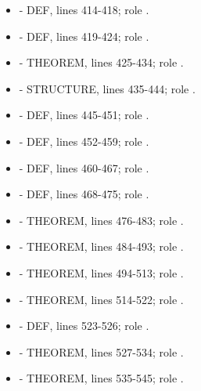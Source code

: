 \begin{itemize}
  400-413; role \texttt{\protect{}}.
\item
  \texttt{\protect{}} - DEF, lines 414-418; role \texttt{\protect{}}.
\item
  \texttt{\protect{}} - DEF, lines 419-424; role \texttt{\protect{}}.
\item
  \texttt{\protect{}} - THEOREM, lines 425-434;
  role \texttt{\protect{}}.
\item
  \texttt{\protect{}} - STRUCTURE, lines 435-444; role
  \texttt{\protect{}}.
\item
  \texttt{\protect{}} - DEF, lines 445-451; role \texttt{\protect{}}.
\item
  \texttt{\protect{}} - DEF, lines 452-459; role
  \texttt{\protect{}}.
\item
  \texttt{\protect{}} - DEF, lines 460-467; role \texttt{\protect{}}.
\item
  \texttt{\protect{}} - DEF, lines 468-475; role
  \texttt{\protect{}}.
\item
  \texttt{\protect{}} - THEOREM, lines 476-483; role
  \texttt{\protect{}}.
\item
  \texttt{\protect{}} - THEOREM, lines 484-493;
  role \texttt{\protect{}}.
\item
  \texttt{\protect{}} - THEOREM, lines 494-513;
  role \texttt{\protect{}}.
\item
  \texttt{\protect{}} - THEOREM, lines 514-522; role
  \texttt{\protect{}}.
\item
  \texttt{\protect{}} - DEF, lines 523-526; role
  \texttt{\protect{}}.
\item
  \texttt{\protect{}} - THEOREM, lines 527-534; role
  \texttt{\protect{}}.
\item
  \texttt{\protect{}} - THEOREM, lines 535-545; role
  \texttt{\protect{}}.
\end{itemize}

